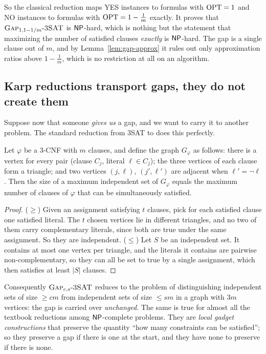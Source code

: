 So the classical reduction maps YES instances to formulas with $\operatorname{OPT}=1$ and NO instances to
formulas with $\operatorname{OPT}=1-\tfrac1m$ exactly.  It proves that $\textsc{Gap}_{1,1-1/m}\text{-}\textsc{3SAT}$
is $\mathsf{NP}$-hard, which is nothing but the statement that maximizing the number of satisfied
clauses \emph{exactly} is $\mathsf{NP}$-hard.  The gap is a single clause out of $m$, and by
Lemma~\ref{lem:gap-approx} it rules out only approximation ratios above $1-\tfrac1m$, which
is no restriction at all on an algorithm.

\subsection{Karp reductions transport gaps, they do not create them}

Suppose now that someone \emph{gives us} a gap, and we want to carry it to another problem.
The standard reduction from $3$SAT to  does this perfectly.

\begin{proposition}\label{prop:triangle}
Let $\varphi$ be a $3$-CNF with $m$ clauses, and define the graph $G_\varphi$ as follows:
there is a vertex for every pair (clause $C_j$, literal $\ell\in C_j$); the three vertices of each
clause form a triangle; and two vertices $(j,\ell)$, $(j',\ell')$ are adjacent when
$\ell'=\neg\ell$.  Then the size of a maximum independent set of $G_\varphi$ equals the
maximum number of clauses of $\varphi$ that can be simultaneously satisfied.
\end{proposition}
\begin{proof}
($\ge$) Given an assignment satisfying $t$ clauses, pick for each satisfied clause one
satisfied literal.  The $t$ chosen vertices lie in different triangles, and no two of them carry
complementary literals, since both are true under the same assignment.  So they are independent.
($\le$) Let $S$ be an independent set.  It contains at most one vertex per triangle, and the
literals it contains are pairwise non-complementary, so they can all be set to true by a single
assignment, which then satisfies at least $|S|$ clauses.
\end{proof}

Consequently $\textsc{Gap}_{c,s}\text{-}\textsc{3SAT}$ reduces to the problem of distinguishing independent sets of
size $\ge cm$ from independent sets of size $\le sm$ in a graph with $3m$ vertices:
the gap is carried over \emph{unchanged}.  The same is true for almost all the textbook
reductions among $\mathsf{NP}$-complete problems.  They are \emph{local gadget constructions} that
preserve the quantity ``how many constraints can be satisfied''; so they preserve a gap if
there is one at the start, and they have none to preserve if there is none.

